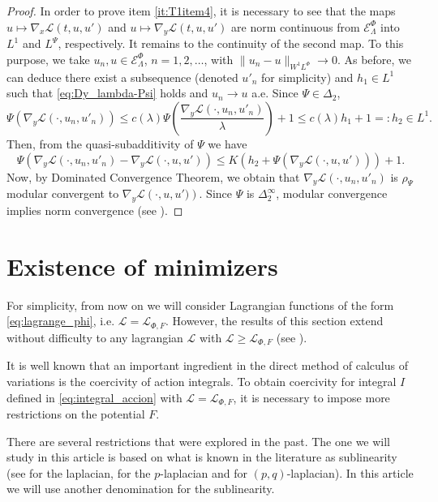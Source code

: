 \documentclass[twoside]{article}
\theoremstyle{remark}
\newcommand{\lphi}{L^{\Phi}}
\newcommand{\lpsi}{L^{\Psi}}
\newcommand{\sobnor}{\|_{W^{1}\lphi}}
\newcommand{\domi}{\mathcal{E}^{\Phi}}
\renewcommand{\leq}{\leqslant}
\renewcommand{\geq}{\geqslant}
\begin{document}
\begin{proof}
In order to prove item  \ref{it:T1item4}, it is necessary to see that the maps $u\mapsto \nabla_x\mathcal{L}(t,u,u')$  
and $u\mapsto \nabla_y\mathcal{L}(t,u,u')$  are norm continuous
from $\domi_{\Lambda} $ into $L^1$ and
 $\lpsi$, respectively.  
It remains to the continuity of the second map. 
To this purpose, we take  $u_n, u \in \domi_{\Lambda}$, $n=1,2,\dots$, with $\|u_n- u\sobnor\to 0$.  
As before, we can deduce there exist a subsequence (denoted $u'_n$ for simplicity) and $h_1 \in L^1$ such that \eqref{eq:Dy_lambda-Psi} holds and $u_n \to u$ a.e.
 Since $\Psi\in\Delta_2$, 
\begin{equation}
\Psi(\nabla_y \mathcal{L}(\cdot,u_n,u'_n))\leq c(\lambda) \Psi\left(\frac{\nabla_y \mathcal{L}(\cdot,u_n,u'_n)}{\lambda}\right)+1\leq c(\lambda)h_1+1=:h_2\in L^1.
\end{equation} 
Then, from the quasi-subadditivity of $\Psi$ we have 
\[\Psi\left(\nabla_y \mathcal{L}(\cdot,u_n,u'_n)-
\nabla_y \mathcal{L}(\cdot,u,u')\right)\leq K (h_2+\Psi(\nabla_y \mathcal{L}(\cdot,u,u')))+1.\]
Now, by Dominated Convergence Theorem, we obtain that 
$\nabla_y \mathcal{L}(\cdot,u_n,u'_n)$ is $\rho_{\Psi}$ modular convergent to $\nabla_y \mathcal{L}\left(\cdot,u,u')\right)$.
Since $\Psi$ is $\Delta_2^{\infty}$, modular convergence implies norm convergence (see \cite{Skaff1969}).
\end{proof}



\section{Existence of minimizers}

For simplicity, from now on we will consider Lagrangian functions of the form \eqref{eq:lagrange_phi}, i.e.  $\mathcal{L}= \mathcal{L}_{\Phi,F}$. However, the results of this section extend without difficulty to any lagrangian $\mathcal{L}$ with $\mathcal{L}\geq \mathcal{L}_{\Phi,F}$ (see \cite{ABGMS2015}).

It is well known that an important ingredient in the direct method of calculus of variations is the coercivity of action integrals. To obtain  coercivity for integral $I$ defined in  \eqref{eq:integral_accion} with $\mathcal{L}= \mathcal{L}_{\Phi,F}$, it is necessary to impose more restrictions on the potential $F$.

There are several restrictions that were explored in the past. The one we will study in this article is based on what is known in the literature as sublinearity (see \cite{tang1998periodic,wu1999periodic,zhao2004periodic} for the laplacian, \cite{tang2010periodic,li2015infinitely} for the $p$-laplacian and \cite{yang2013existence,li2014periodic,pasca2010periodic,pacsca2010some} for $(p,q)$-laplacian). In this article we will use another denomination for the sublinearity.
\end{document}
